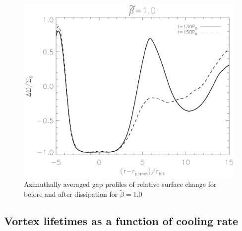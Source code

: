 \begin{figure}
  \includegraphics[width=\linewidth]{figures/gapchange}
  \caption{Azimuthally averaged gap profiles of relative surface change for
 before and after dissipation for $\tilde\beta=1.0$}
\end{figure}

\subsection{Vortex lifetimes as a function of cooling rate}




